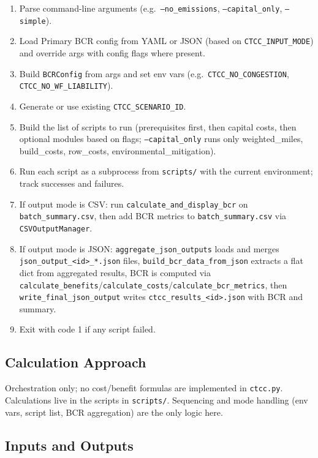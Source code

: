 \documentclass[ctcc_full_documentation.tex]{subfiles}
\begin{document}
\begin{enumerate}
    \item Parse command-line arguments (e.g.\ \texttt{--no\_emissions}, \texttt{--capital\_only}, \texttt{--simple}).
    \item Load Primary BCR config from YAML or JSON (based on \texttt{CTCC\_INPUT\_MODE}) and override args with config flags where present.
    \item Build \texttt{BCRConfig} from args and set env vars (e.g.\ \texttt{CTCC\_NO\_CONGESTION}, \texttt{CTCC\_NO\_WF\_LIABILITY}).
    \item Generate or use existing \texttt{CTCC\_SCENARIO\_ID}.
    \item Build the list of scripts to run (prerequisites first, then capital costs, then optional modules based on flags; \texttt{--capital\_only} runs only weighted\_miles, build\_costs, row\_costs, environmental\_mitigation).
    \item Run each script as a subprocess from \texttt{scripts/} with the current environment; track successes and failures.
    \item If output mode is CSV: run \texttt{calculate\_and\_display\_bcr} on \texttt{batch\_summary.csv}, then add BCR metrics to \texttt{batch\_summary.csv} via \texttt{CSVOutputManager}.
    \item If output mode is JSON: \texttt{aggregate\_json\_outputs} loads and merges \texttt{json\_output\_<id>\_*.json} files, \texttt{build\_bcr\_data\_from\_json} extracts a flat dict from aggregated results, BCR is computed via \texttt{calculate\_benefits}/\texttt{calculate\_costs}/\texttt{calculate\_bcr\_metrics}, then \texttt{write\_final\_json\_output} writes \texttt{ctcc\_results\_<id>.json} with BCR and summary.
    \item Exit with code 1 if any script failed.
\end{enumerate}

\subsection{Calculation Approach}

Orchestration only; no cost/benefit formulas are implemented in \texttt{ctcc.py}. Calculations live in the scripts in \texttt{scripts/}. Sequencing and mode handling (env vars, script list, BCR aggregation) are the only logic here.

\subsection{Inputs and Outputs}
\end{document}
